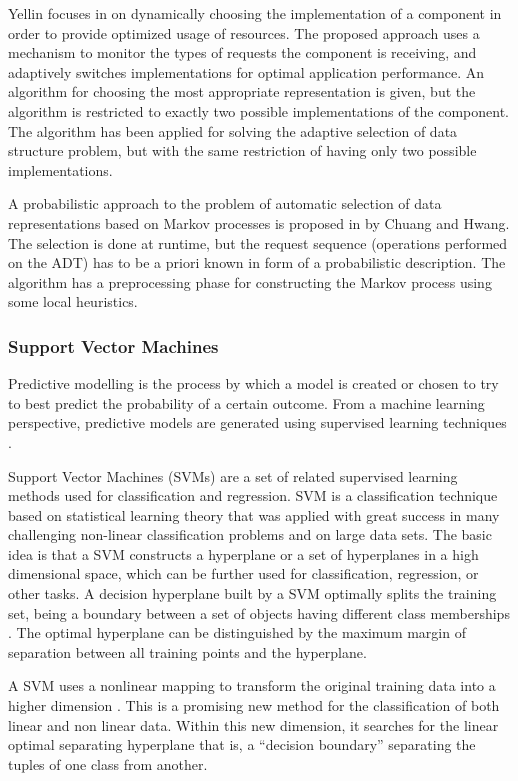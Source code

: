 Yellin focuses in \cite{Yellin} on dynamically choosing the implementation  of a component in order to provide optimized usage of resources. The proposed approach uses a mechanism to monitor the types of requests the component is receiving, and adaptively switches implementations for optimal application performance. An algorithm for choosing the most appropriate representation is given, but the algorithm is restricted to exactly two possible implementations of the component. The algorithm has been applied for solving the adaptive selection of data structure problem, but with the same restriction of having only two possible implementations.

A probabilistic approach to the problem of automatic selection of data representations based on Markov processes is proposed in \cite{chuang} by Chuang and Hwang. The selection is done at runtime, but the request sequence (operations performed on the ADT) has to be a priori known in form of a probabilistic description. The algorithm has a preprocessing phase for constructing the Markov process using some local heuristics.

 
\subsubsection{Support Vector Machines}\label{bck}

Predictive modelling \cite{geisser} is the process by which a model is created or chosen to try to best predict the probability of a certain outcome. From a machine learning perspective, predictive models are generated using supervised learning techniques \cite{Russell02Artificial}. 

Support Vector Machines (SVMs) \cite{svm} are a set of related supervised learning methods used for classification and regression. SVM is a classification technique based on statistical learning theory \cite{nello, smola} that was applied with great success in many challenging non-linear classification problems and on large data sets. The basic idea is that a SVM constructs a hyperplane or a set of hyperplanes in a high dimensional space, which can be further used for classification, regression, or other tasks. A decision hyperplane built by a SVM  optimally splits the training set, being a boundary between a set of objects having different class memberships \cite{wspsvm}. The optimal hyperplane can be distinguished by the maximum margin of separation between all training points and the hyperplane.

A SVM uses a nonlinear mapping to transform the original
training data into a higher dimension \cite{nello}. This is a promising
new method for the classification of both linear and non
linear data. Within this new dimension, it searches for
the linear optimal separating hyperplane that is, a
``decision boundary'' separating the tuples of one class
from another.

